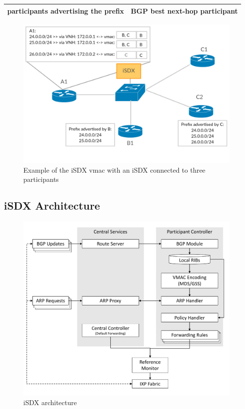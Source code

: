 \begin{tabular}{|r|l|}
  \hline 
  participants advertising the prefix & BGP best next-hop participant \\
  \hline
\end{tabular}

\begin{figure}[h]
\includegraphics[scale = 0.36]{Figures/intro_sdx_vmac.pdf}
\caption{Example of the iSDX vmac with an iSDX connected to three participants}
\end{figure}

\subsection{\label{chapter2:iSX:iSDX architecture}iSDX Architecture}
\begin{figure}[h]
\includegraphics[scale = 0.4]{Figures/bckdgrnd_sdx_architecture_cropped.pdf}
\caption{iSDX architecture}
\end{figure}

